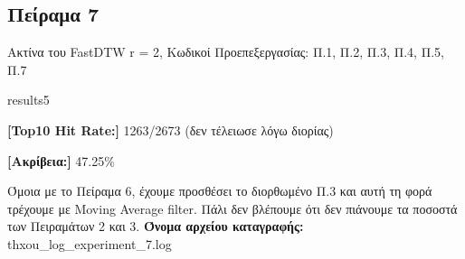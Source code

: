 \subsection{Πείραμα 7}
Ακτίνα του FastDTW r = 2, Κωδικοί Προεπεξεργασίας: Π.1, Π.2, Π.3, Π.4, Π.5, Π.7
\begin{labeling}{results5}
  \item \textbf{[Top10 Hit Rate:]} 1263/2673 (δεν τέλειωσε λόγω διορίας)
  \item \textbf{[Ακρίβεια:]} 47.25\%
\end{labeling}
Όμοια με το Πείραμα 6, έχουμε προσθέσει το διορθωμένο Π.3 και αυτή τη φορά τρέχουμε με Moving Average filter. Πάλι δεν βλέπουμε ότι δεν πιάνουμε τα ποσοστά των Πειραμάτων 2 και 3.
\textbf{Όνομα αρχείου καταγραφής:} thxou\_log\_experiment\_7.log